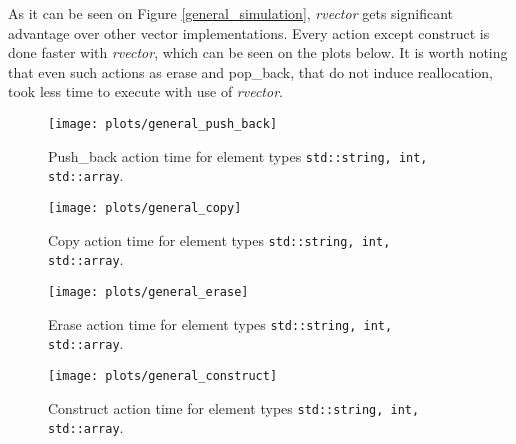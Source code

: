 \documentclass[inz, english, shortabstract]{iithesis}
\begin{document}
As it can be seen on Figure \ref{general_simulation}, {\it rvector} gets significant advantage over other vector implementations. Every action except construct is done faster with {\it rvector}, which can be seen on the plots below. It is worth noting that even such actions as erase and pop\_back, that do not induce reallocation, took less time to execute with use of {\it rvector}. 

\begin{figure}[h!]
\texttt{[image: plots/general\_push\_back]}
\caption{Push\_back action time for element types \lstinline{std::string, int, std::array}.}
\label{general_push_back}
\end{figure}

\begin{figure}[h!]
\texttt{[image: plots/general\_copy]}
\caption{Copy action time for element types \lstinline{std::string, int, std::array}.}
\label{general_copy}
\end{figure}

\begin{figure}[h!]
\texttt{[image: plots/general\_erase]}
\caption{Erase action time for element types \lstinline{std::string, int, std::array}.}
\label{general_erase}
\end{figure}

\begin{figure}[h!]
\texttt{[image: plots/general\_construct]}
\caption{Construct action time for element types \lstinline{std::string, int, std::array}.}
\label{general_construct}
\end{figure}
\end{document}
